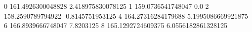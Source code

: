 0 161.4926300048828 2.418975830078125
1 159.0736541748047 0.0
2 158.2590789794922 -0.8145751953125
4 164.27316284179688 5.1995086669921875
6 166.8939666748047 7.8203125
8 165.1292724609375 6.0556182861328125

